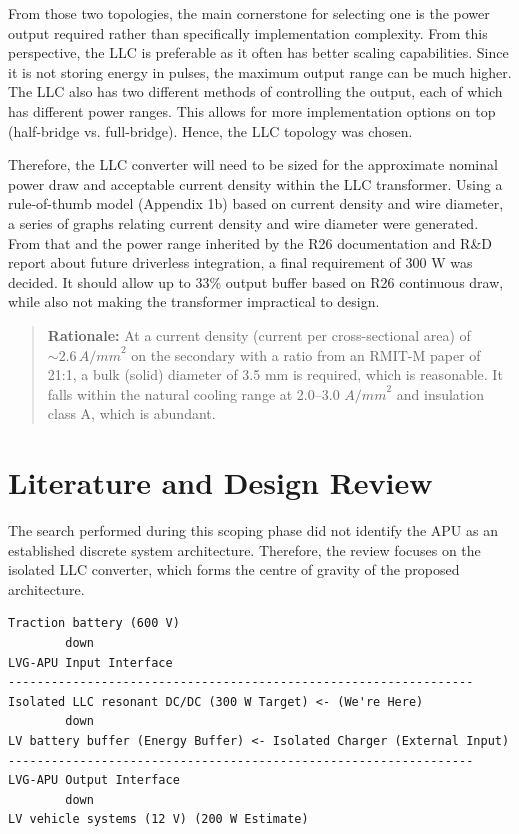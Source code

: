 \documentclass[12pt,a4paper]{article}
\begin{document}
\vspace{0.5cm}

From those two topologies, the main cornerstone for selecting one is the power output required rather than specifically implementation complexity. From this perspective, the LLC is preferable as it often has better 
scaling capabilities. Since it is not storing energy in pulses, the maximum output range can be much higher. The LLC also has two different methods of controlling the output, each of which has different power ranges. 
This allows for more implementation options on top (half-bridge vs. full-bridge). Hence, the LLC topology was chosen.

\vspace{0.5cm}

Therefore, the LLC converter will need to be sized for the approximate nominal power draw and acceptable current density within the LLC transformer. Using a rule-of-thumb model (Appendix 1b) based on current density and 
wire diameter, a series of graphs relating current density and wire diameter were generated. From that and the power range inherited by the R26 documentation and R\&D report about future driverless integration, a 
final requirement of 300 W was decided. It should allow up to 33\% output buffer based on R26 continuous draw, while also not making the transformer impractical to design.

\begin{quote}
  \textbf{Rationale:} 
  At a current density (current per cross-sectional area) of $\sim 2.6 \, {A/mm}^2$ on the secondary with a ratio from an RMIT-M paper of 21:1, a bulk (solid) diameter of 3.5 mm is required, which is reasonable. 
  It falls within the natural cooling range at 2.0--3.0 ${A/mm}^2$ and insulation class A, which is abundant.
\end{quote}

\section{Literature and Design Review}

The search performed during this scoping phase did not identify the APU as an established discrete system architecture. Therefore, the review focuses on the isolated
LLC converter, which forms the centre of gravity of the proposed architecture.

\begin{lstlisting}
Traction battery (600 V)
        down
LVG-APU Input Interface
-----------------------------------------------------------------
Isolated LLC resonant DC/DC (300 W Target) <- (We're Here)
        down
LV battery buffer (Energy Buffer) <- Isolated Charger (External Input)
-----------------------------------------------------------------
LVG-APU Output Interface
        down
LV vehicle systems (12 V) (200 W Estimate)
\end{lstlisting}
\end{document}
